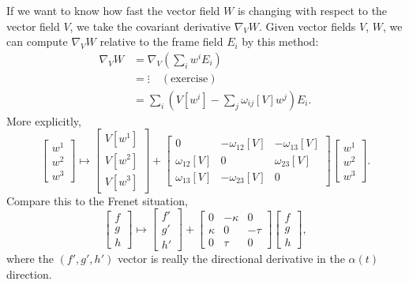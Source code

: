If we want to know how fast the vector field $W$ is changing with
respect to the vector field $V$, we take the covariant derivative
$\nabla_{V}W$. Given vector fields $V$, $W$, we can compute $\nabla_{V}W$
relative to the frame field $E_{i}$ by this method:
\begin{equation}
  \begin{split}
    \nabla_{V}W &= \nabla_{V}\left(\sum_{i}w^{i}E_{i}\right)\\
    &= \vdots\quad(\mbox{exercise})\\
    &= \sum_{i}\left(V[w^{i}] - \sum_{j}\omega_{ij}[V]w^{j}\right)E_{i}.
  \end{split}
\end{equation}
More explicitly,
\begin{equation}
\begin{bmatrix}w^{1}\\w^{2}\\w^{3}
\end{bmatrix}\mapsto
\begin{bmatrix}V[w^{1}]\\V[w^{2}]\\V[w^{3}]
\end{bmatrix} + 
\begin{bmatrix}
  0           & -\omega_{12}[V] & -\omega_{13}[V]\\
\omega_{12}[V] &      0         & \omega_{23}[V]\\
\omega_{13}[V] & -\omega_{23}[V] & 0
\end{bmatrix}
\begin{bmatrix}w^{1}\\w^{2}\\w^{3}
\end{bmatrix}.
\end{equation}
Compare this to the Frenet situation,
\begin{equation}
\begin{bmatrix}f\\g\\h
\end{bmatrix}\mapsto
\begin{bmatrix}f'\\g'\\h'
\end{bmatrix} + 
\begin{bmatrix}
  0    & -\kappa & 0\\
\kappa &      0  & -\tau\\
0      & \tau    & 0
\end{bmatrix}
\begin{bmatrix}f\\g\\h
\end{bmatrix},
\end{equation}
where the $(f',g',h')$ vector is really the directional derivative in
the $\alpha(t)$ direction.

